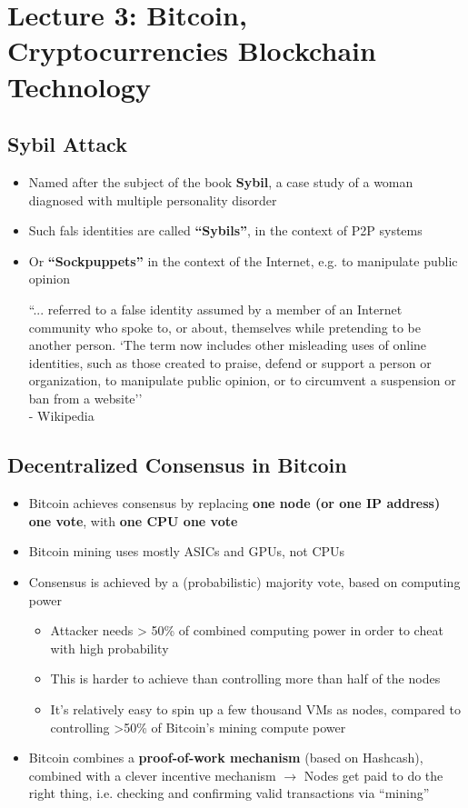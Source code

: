 \section{Lecture 3: Bitcoin, Cryptocurrencies Blockchain Technology}
\subsection{Sybil Attack}
\begin{itemize}
	\item Named after the subject of the book \textbf{Sybil}, a case study of a woman diagnosed with multiple personality disorder
	\item Such fals identities are called \textbf{``Sybils''}, in the context of P2P systems
	\item Or \textbf{``Sockpuppets''} in the context of the Internet, e.g. to manipulate public opinion
	\begin{leftbar}
		``... referred to a false identity assumed by a member of an Internet community who spoke to, or about, themselves while pretending to be another person. `The term now includes other misleading uses of online identities, such as those created to praise, defend or support a person or organization, to manipulate public opinion, or to circumvent a suspension or ban from a website''\\
		- Wikipedia
	\end{leftbar}
\end{itemize}

\subsection{Decentralized Consensus in Bitcoin}
\begin{itemize}
	\item Bitcoin achieves consensus by replacing \textbf{one node (or one IP address) one vote}, with \textbf{one CPU one vote}
	\item Bitcoin mining uses mostly ASICs and GPUs, not CPUs
	\item Consensus is achieved by a (probabilistic) majority vote, based on computing power
	\begin{itemize}
		\item Attacker needs > 50\% of combined computing power in order to cheat with high probability
		\item This is harder to achieve than controlling more than half of the nodes
		\item It's relatively easy to spin up a few thousand VMs as nodes, compared to controlling >50\% of Bitcoin's mining compute power
	\end{itemize}
	\item Bitcoin combines a \textbf{proof-of-work mechanism} (based on Hashcash), combined with a clever incentive mechanism $\rightarrow$ Nodes get paid to do the right thing, i.e. checking and confirming valid transactions via ``mining''
\end{itemize}


